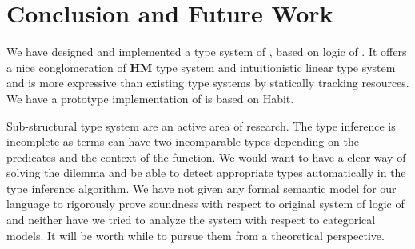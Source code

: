 \chapter{Conclusion and Future Work}\label{chp:conclusion}

We have designed and implemented a type system of \qub{}, based on logic of \BI{}.
It offers a nice conglomeration of \textbf{HM} type system and intuitionistic linear type system and is more
expressive than existing type systems by statically tracking resources.
We have a prototype implementation of \qub{} is based on Habit\citep{apoorv_qub_2018}.

Sub-structural type system are an active area of research.
The \qub{} type inference is incomplete as terms can have two incomparable types depending
on the predicates and the context of the function. We would want to have a clear way of solving
the dilemma and be able to detect appropriate types automatically in the type inference algorithm.
We have not given any formal semantic model for our language to rigorously prove soundness with respect to original
system of logic of \BI{} and neither have we tried to analyze the system with respect to categorical models.
It will be worth while to pursue them from a theoretical perspective.